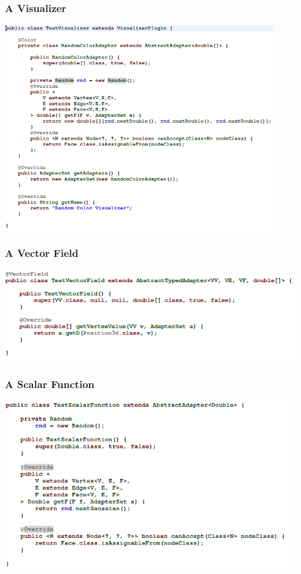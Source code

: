 \documentclass[12pt]{beamer}
\begin{document}
\begin{frame}
\frametitle{A Visualizer}
\begin{center}
\includegraphics[height=9cm]{visualizer.png}\\	
\end{center}
\end{frame}

\begin{frame}
\frametitle{A Vector Field}
\begin{center}
\includegraphics[height=4cm]{vectorfield.png}\\	
\end{center}
\end{frame}

\begin{frame}
\frametitle{A Scalar Function}
\begin{center}
\includegraphics[height=7.4cm]{scalarfunction.png}\\	
\end{center}
\end{frame}
\end{document}
